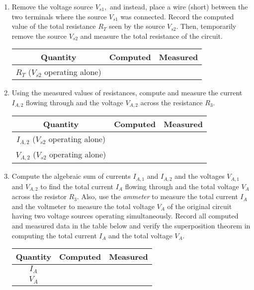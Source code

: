 \begin{enumerate}
   
\item Remove the voltage source $V_{s1},$ and  instead, place a wire (short) between the two terminals where the source $V_{s1}$ was connected. Record the computed value of the total resistance $R_T$ seen by the source $V_{s2}.$ Then, temporarily remove the source $V_{s2}$ and measure the total resistance of the circuit. 

  \begin{center}
    \begin{tabular}{|c|c|c|}
      \toprule
      Quantity & Computed & Measured\\
      \toprule
      $R_T$ ($V_{s2}$ operating alone) & & \\
      \bottomrule
    \end{tabular}     
  \end{center}


\item Using the measured values of resistances, compute and measure the current $I_{A,2}$ flowing through and the voltage $V_{A,2}$ across the resistance $R_3.$

  
  \begin{center}
    \begin{tabular}{|c|c|c|}
      \toprule
      Quantity & Computed & Measured\\
      \toprule
      $I_{A,2}$ ($V_{s2}$ operating alone) & & \\
      \hline
    $V_{A,2}$ ($V_{s2}$ operating alone) & & \\      
      \bottomrule
    \end{tabular}    
  \end{center}


   
\item Compute the algebraic sum of currents $I_{A,1}$ and $I_{A,2}$ and the voltages  $V_{A,1}$ and $V_{A,2}$  to find the total current $I_A$ flowing through and the total voltage $V_A$ across the resistor $R_3.$ Also, use the \emph{ammeter} to measure the total current $I_A$ and the voltmeter to measure the total voltage $V_A$ of the original circuit having two voltage sources operating simultaneously. Record all computed and measured data in the table below and verify the superposition theorem in computing the total current $I_A$ and the total voltage $V_A.$ 

   \begin{center}
     \begin{tabular}{|c|c|c|}
       \toprule
       Quantity & Computed & Measured\\
       \toprule
       $I_A$ & & \\
       \hline
       $V_A$ & & \\       
       \bottomrule
     \end{tabular}     
   \end{center}

   
   
\end{enumerate}

